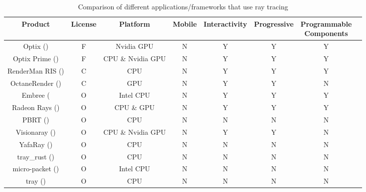 \begin{table}[H]
\centering
\caption{Comparison of different applications/frameworks that use ray tracing}
\label{comparison state of the art}
\hspace*{-2.0cm}
\scriptsize
\begin{tabular}{|c|c|c|c|c|c|c|c|}
\hline
\textbf{Product}											& \textbf{License}	& \textbf{Platform}	& \textbf{Mobile}		& \textbf{Interactivity}	& \textbf{Progressive}	& \makecell{\textbf{Programmable} \\ \textbf{Components}}\\ \hline
Optix (\cite{Optix})											& F                	& Nvidia GPU 			& N				& Y                  	& Y                 		& Y\\ \hline
Optix Prime (\cite{OptixPrime})								& F                	& CPU \& Nvidia GPU 	& N				& Y                  	& Y                 		& Y\\ \hline
RenderMan RIS (\cite{RIS})									& C       	& CPU 		             & N                  		& Y                 		& Y				& Y\\ \hline
OctaneRender (\cite{OctaneRender})							& C       	& GPU 		             & N                  		& Y                 		& Y				& N\\ \hline
Embree (\cite{Embree}										& O     	& Intel CPU			& N				& Y                  	& Y                      	& Y\\ \hline
Radeon Rays (\cite{RadeonRays})							& O	& CPU \& GPU		& N				& Y                    	& Y                     	& Y\\ \hline
PBRT (\cite{PBRT})	 									& O	& CPU				& N                 		& N                 		& N				& N\\ \hline
Visionaray (\cite{Visionaray})									& O     	& CPU \& Nvidia GPU	& N                  		& Y				& Y                  	& N\\ \hline
YafaRay	(\cite{YafaRay})									& O     	& CPU 				& N                  		& N				& N                  		& N\\ \hline
tray\_rust (\cite{trayrust})									& O    	& CPU                  	& N                   	& N                  		& N                 		& N\\ \hline
micro-packet (\cite{micro-packet})							& O     	& Intel CPU 			& N                  		& N                  		& N 				& N\\ \hline
tray (\cite{tray})											& O     	& CPU 				& N				& N                     	& N                  		& N\\ \hline

\end{tabular}
\end{table}
